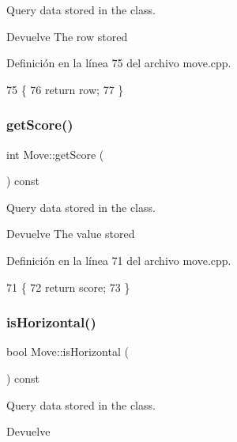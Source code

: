 Query data stored in the class. 

\begin{DoxyReturn}{Devuelve}
The row stored 
\end{DoxyReturn}


Definición en la línea 75 del archivo move.\+cpp.


\begin{DoxyCode}
75                       \{
76     \textcolor{keywordflow}{return} row;
77 \}
\end{DoxyCode}
\mbox{\label{classMove_a5c6f95db47cfd83c5f6c039cfb5b9c2d}} 
\subsubsection{\texorpdfstring{get\+Score()}{getScore()}}
{\footnotesize\ttfamily int Move\+::get\+Score (\begin{DoxyParamCaption}{ }\end{DoxyParamCaption}) const}



Query data stored in the class. 

\begin{DoxyReturn}{Devuelve}
The value stored 
\end{DoxyReturn}


Definición en la línea 71 del archivo move.\+cpp.


\begin{DoxyCode}
71                         \{
72     \textcolor{keywordflow}{return} score;
73 \}
\end{DoxyCode}
\mbox{\label{classMove_a4092ef4f8137323616b470104704ad27}} 
\subsubsection{\texorpdfstring{is\+Horizontal()}{isHorizontal()}}
{\footnotesize\ttfamily bool Move\+::is\+Horizontal (\begin{DoxyParamCaption}{ }\end{DoxyParamCaption}) const}



Query data stored in the class. 

\begin{DoxyReturn}{Devuelve}

\end{DoxyReturn}

